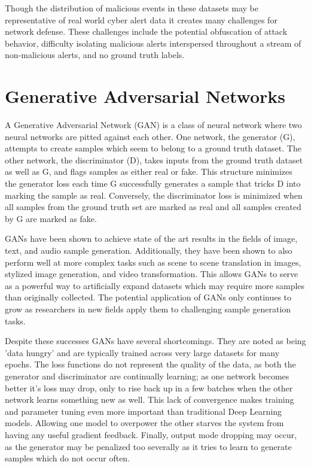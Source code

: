 \documentclass[12pt,american]{report}
\begin{document}
Though the distribution of malicious events in these datasets may be representative of real world cyber alert data it creates many challenges for network defense. These challenges include the potential obfuscation of attack behavior, difficulty isolating malicious alerts interspersed throughout a stream of non-malicious alerts, and no ground truth labels. 

\section{Generative Adversarial Networks}

A Generative Adversarial Network (GAN) is a class of neural network where two neural networks are pitted against each other. One network, the generator (G), attempts to create samples which seem to belong to a ground truth dataset. The other network, the discriminator (D), takes inputs from the ground truth dataset as well as G, and flags samples as either real or fake. This structure minimizes the generator loss each time G successfully generates a sample that tricks D into marking the sample as real. Conversely, the discriminator loss is minimized when all samples from the ground truth set are marked as real and all samples created by G are marked as fake.

GANs have been shown to achieve state of the art results in the fields of image, text, and audio sample generation. Additionally, they have been shown to also perform well at more complex tasks such as scene to scene translation in images, stylized image generation, and video transformation. This allows GANs to serve as a powerful way to artificially expand datasets which may require more samples than originally collected. The potential application of GANs only continues to grow as researchers in new fields apply them to challenging sample generation tasks.

Despite these successes GANs have several shortcomings. They are noted as being 'data hungry' and are typically trained across very large datasets for many epochs. The loss functions do not represent the quality of the data, as both the generator and discriminator are continually learning; as one network becomes better it's loss may drop, only to rise back up in a few batches when the other network learns something new as well. This lack of convergence makes training and parameter tuning even more important than traditional Deep Learning models. Allowing one model to overpower the other starves the system from having any useful gradient feedback. Finally, output mode dropping may occur, as the generator may be penalized too severally as it tries to learn to generate samples which do not occur often. 
\end{document}
